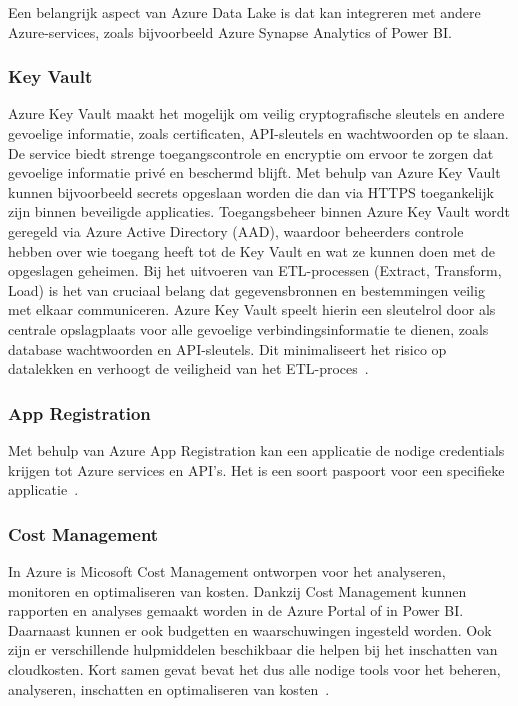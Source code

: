 Een belangrijk aspect van Azure Data Lake is dat kan integreren met andere Azure-services, zoals bijvoorbeeld Azure Synapse Analytics of Power BI.

\subsubsection{Key Vault}

Azure Key Vault maakt het mogelijk om veilig cryptografische sleutels en andere gevoelige informatie, zoals certificaten, API-sleutels en wachtwoorden op te slaan. De service biedt strenge toegangscontrole en encryptie om ervoor te zorgen dat gevoelige informatie privé en beschermd blijft. Met behulp van Azure Key Vault kunnen bijvoorbeeld secrets opgeslaan worden die dan via HTTPS toegankelijk zijn binnen beveiligde applicaties. Toegangsbeheer binnen Azure Key Vault wordt geregeld via Azure Active Directory (AAD), waardoor beheerders controle hebben over wie toegang heeft tot de Key Vault en wat ze kunnen doen met de opgeslagen geheimen. Bij het uitvoeren van ETL-processen (Extract, Transform, Load) is het van cruciaal belang dat gegevensbronnen en bestemmingen veilig met elkaar communiceren. Azure Key Vault speelt hierin een sleutelrol door als centrale opslagplaats voor alle gevoelige verbindingsinformatie te dienen, zoals database wachtwoorden en API-sleutels. Dit minimaliseert het risico op datalekken en verhoogt de veiligheid van het ETL-proces~\autocite{Microsoft2024g}.

\subsubsection{App Registration}

Met behulp van Azure App Registration kan een applicatie de nodige credentials krijgen tot Azure services en API's. Het is een soort paspoort voor een specifieke applicatie~\autocite{Anaparthy2023}.

\subsubsection{Cost Management}

In Azure is Micosoft Cost Management ontworpen voor het analyseren, monitoren en optimaliseren van kosten. Dankzij Cost Management kunnen rapporten en analyses gemaakt worden in de Azure Portal of in Power BI. Daarnaast kunnen er ook budgetten en waarschuwingen ingesteld worden. Ook zijn er verschillende hulpmiddelen beschikbaar die helpen bij het inschatten van cloudkosten. Kort samen gevat bevat het dus alle nodige tools voor het beheren, analyseren, inschatten en optimaliseren van kosten~\autocite{Microsoft2023}.

